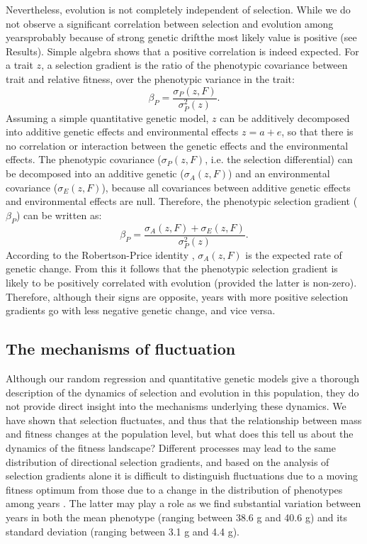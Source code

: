 Nevertheless, evolution is not completely independent of selection. While we do not observe a significant correlation between selection and evolution among years\textemdash probably because of strong genetic drift\textemdash the most likely value is positive (see Results). 
Simple algebra shows that a positive correlation is indeed expected. For a trait $z$, a selection gradient is the ratio of the phenotypic covariance between trait and relative fitness, over the phenotypic variance in the trait:
\begin{equation*}
\beta_P = \frac{\sigma_P(z, F)}{\sigma^2_P(z)} \text{.}
\end{equation*}
Assuming a simple quantitative genetic model, $z$ can be additively decomposed into additive genetic effects and environmental effects $z = a + e$, so that there is no correlation or interaction between the genetic effects and the environmental effects. The phenotypic covariance ($\sigma_P(z, F)$, i.e. the selection differential) can be decomposed into an additive genetic ($\sigma_A(z,F)$) and an environmental covariance ($\sigma_E(z,F)$), because all covariances between additive genetic effects and environmental effects are null. Therefore, the phenotypic selection gradient ($\beta_P$) can be written as:
\begin{equation*}
\beta_P = \frac{\sigma_A(z,F)+\sigma_E(z,F)}{\sigma^2_P(z)} \text{.}
\end{equation*}
According to the Robertson-Price identity \parencite{Robertson1966, Price1970}, $\sigma_A(z,F)$ is the expected rate of genetic change. From this it follows that the phenotypic selection gradient is likely to be positively correlated with evolution (provided the latter is non-zero). Therefore, although their signs are opposite, years with more positive selection gradients go with less negative genetic change, and vice versa. 

\subsection*{The mechanisms of fluctuation}
Although our random regression and quantitative genetic models give a thorough description of the dynamics of selection and evolution in this population, they do not provide direct insight into the mechanisms underlying these dynamics. We have shown that selection fluctuates, and thus that the relationship between mass and fitness changes at the population level, but what does this tell us about the dynamics of the fitness landscape? Different processes may lead to the same distribution of directional selection gradients, and based on the analysis of selection gradients alone it is difficult to distinguish fluctuations due to a moving fitness optimum from those due to a change in the distribution of phenotypes among years \parencite{Chevin2014}. The latter may play a role as we find substantial variation between years in both the mean phenotype (ranging between 38.6 g and 40.6 g) and its standard deviation (ranging between 3.1 g and 4.4 g).

